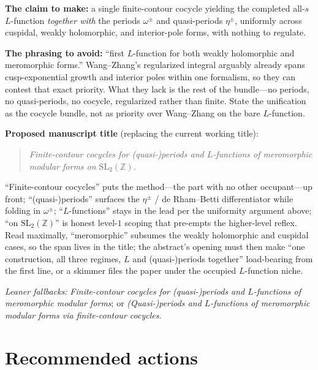 \documentclass[11pt]{article}
\newcommand{\Z}{\mathbb{Z}}
\begin{document}
\textbf{The claim to make:} a single finite-contour cocycle yielding the completed all-$s$
$L$-function \emph{together with} the periods $\omega^{\pm}$ and quasi-periods $\eta^{\pm}$,
uniformly across cuspidal, weakly holomorphic, and interior-pole forms, with nothing to
regulate.

\textbf{The phrasing to avoid:} ``first $L$-function for both weakly holomorphic and
meromorphic forms.'' Wang--Zhang's regularized integral arguably already spans
cusp-exponential growth and interior poles within one formalism, so they can contest that
exact priority. What they lack is the rest of the bundle---no periods, no quasi-periods, no
cocycle, regularized rather than finite. State the unification as the cocycle bundle, not as
priority over Wang--Zhang on the bare $L$-function.

\textbf{Proposed manuscript title} (replacing the current working title):
\begin{quote}
\emph{Finite-contour cocycles for (quasi-)periods and $L$-functions of meromorphic modular
forms on $\mathrm{SL}_2(\Z)$.}
\end{quote}
``Finite-contour cocycles'' puts the method---the part with no other occupant---up front;
``(quasi-)periods'' surfaces the $\eta^{\pm}$ / de Rham--Betti differentiator while folding in
$\omega^{\pm}$; ``$L$-functions'' stays in the lead per the uniformity argument above;
``on $\mathrm{SL}_2(\Z)$'' is honest level-$1$ scoping that pre-empts the higher-level reflex.
Read maximally, ``meromorphic'' subsumes the weakly holomorphic and cuspidal cases, so the
span lives in the title; the abstract's opening must then make ``one construction, all three
regimes, $L$ and (quasi-)periods together'' load-bearing from the first line, or a skimmer
files the paper under the occupied $L$-function niche.

\emph{Leaner fallbacks:} \emph{Finite-contour cocycles for (quasi-)periods and $L$-functions
of meromorphic modular forms}; or \emph{(Quasi-)periods and $L$-functions of meromorphic
modular forms via finite-contour cocycles}.

\section{Recommended actions}
\end{document}
